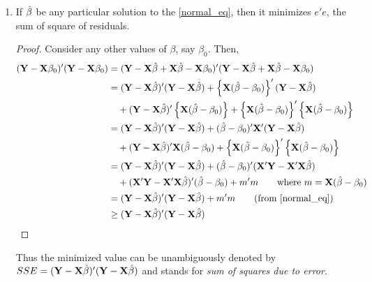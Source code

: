 \documentclass[10pt, a4paper]{article}
\begin{document}
\begin{enumerate}[1.]
	\item If \( \hat{\beta} \) be any particular solution to the \eqref{normal_eq}, then it minimizes \( e'e \), the sum of square of residuals.
\begin{proof}
Consider any other values of \( \beta \), say \( \beta_{0} \). Then,
\begin{align*}
	(\mathbf{Y}-\mathbf{X}\beta_{0})'(\mathbf{Y}-\mathbf{X}\beta_{0}) &= (\mathbf{Y} - \mathbf{X}\htb + \mathbf{X}\htb - \mathbf{X}\beta_{0})'(\mathbf{Y} - \mathbf{X}\htb + \mathbf{X}\htb - \mathbf{X}\beta_{0}) \\
				      &= (\mathbf{Y} - \mathbf{X}\htb)'(\mathbf{Y} - \mathbf{X}\htb) + \left\{ \mathbf{X}(\htb - \beta_{0}) \right\} ' (\mathbf{Y}-\mathbf{X}\htb) \\
				      &\quad + (\mathbf{Y}-\mathbf{X}\htb)' \left\{ \mathbf{X}(\htb - \beta_{0}) \right\} + \left\{ \mathbf{X}(\htb - \beta_{0}) \right\}' \left\{ \mathbf{X}(\htb - \beta_{0}) \right\} \\
				      &= (\mathbf{Y} - \mathbf{X}\htb)'(\mathbf{Y} - \mathbf{X}\htb) + (\htb - \beta_{0})'\mathbf{X}'(\mathbf{Y}-\mathbf{X}\htb) \\
				      &\quad + (\mathbf{Y}-\mathbf{X}\htb)'\mathbf{X}(\htb-\beta_{0}) + \left\{ \mathbf{X}(\htb - \beta_{0}) \right\}' \left\{ \mathbf{X}(\htb - \beta_{0}) \right\} \\
				      &= (\mathbf{Y} - \mathbf{X}\htb)'(\mathbf{Y} - \mathbf{X}\htb) + (\htb - \beta_{0})'(\mathbf{X}'\mathbf{Y} - \mathbf{X}'\mathbf{X}\htb) \\
				      &\quad + (\mathbf{X}'\mathbf{Y} - \mathbf{X}'\mathbf{X}\htb)'(\htb-\beta_{0}) + m'm \tag*{where \( m = \mathbf{X}(\htb - \beta_{0}) \)} \\
				      &= (\mathbf{Y} - \mathbf{X}\htb)'(\mathbf{Y} - \mathbf{X}\htb) + m'm \tag*{(from \eqref{normal_eq})} \\
				      & \geq (\mathbf{Y} - \mathbf{X}\htb)'(\mathbf{Y} - \mathbf{X}\htb) \qedhere
\end{align*}
\end{proof}

Thus the minimized value can be unambiguously denoted by \( SSE = (\mathbf{Y} - \mathbf{X}\hat{\beta})'(\mathbf{Y} - \mathbf{X}\hat{\beta}) \) and stands for \textit{sum of squares due to error}.
\end{enumerate}
\end{document}
